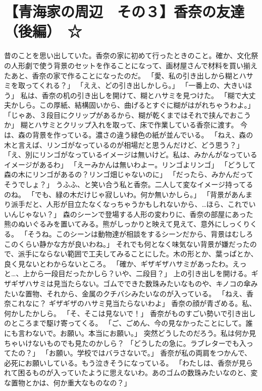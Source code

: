 \section{【青海家の周辺　その３】香奈の友達（後編）　☆}

昔のことを思い出していた。香奈の家に初めて行ったときのこと。確か、文化祭の人形劇で使う背景のセットを作ることになって、画材屋さんで材料を買い揃えたあと、香奈の家で作ることになったのだ。
「愛、私の引き出しから糊とハサミを取ってくれる？」
「ええ、どの引き出しかしら。」
「一番上の、大きいほう」
私は、香奈の机の引き出しを開けて、糊とハサミを見つけた。
「糊で大丈夫かしら。この厚紙、結構固いから、曲げるとすぐに糊がはがれちゃうわよ。」
「じゃあ、３段目にクリップがあるから、糊が乾くまではそれで挟んでおこうか」
糊とハサミとクリップ入れを取って、床で作業している香奈に渡す。
今は、森の背景を作っている。濃さの違う緑色の紙が並んでいる。
「ねえ、森の木と言えば、リンゴがなっているのが相場だと思うんだけど、どう思う？」
「え、別にリンゴがなっているイメージは無いけど。私は、みかんがなっているイメージがあるわ」
「えーみかんは無いわよー。リンゴよリンゴ」
「どうして森の木にリンゴがあるの？リンゴ畑じゃないのに」
「だったら、みかんだってそうでしょ？」
うふふ、と笑い合う私と香奈。二人して変なイメージ持ってるのね。
「でも、緑の木だけじゃ寂しいわ。何か無いかしら。」
「背景があんまり派手だと、人形が目立たなくなっちゃうかもしれないから、…ほら、これでいいんじゃない？」
森のシーンで登場する人形の変わりに、香奈の部屋にあった熊のぬいぐるみを置いてみる。熊がしっかりと映えて見えて、意外にしっくりくる。
「そうね。このシーンは動物達が相談をするシーンだから、背景はむしろこのくらい静かな方が良いわね。」
それでも何となく味気ない背景が嫌だったので、派手にならない範囲で工夫してみることにした。木の形とか、葉っぱとか、良く見ないとわからないところ。
「確か、ギザギザハサミがあったわ。えっと…、上から一段目だったかしら？いや、二段目？」
上の引き出しを開ける。ギザギザハサミは見当たらない。ゴムでできた数珠みたいなものや、キノコの傘みたいな置物、それから、金属のクチバシみたいなのが入っている。
「ねえ、香奈これなに？ ギザギザのハサミ見当たらないわよ」
香奈の顔が青ざめる。私、何かしたかしら。
「そ、そこは見ないで！」
香奈がものすごい勢いで引き出しのところまで駆け寄ってくる。
「ご、ごめん、今の見なかったことにして。誰にも言わないで。お願い。本当にお願い。」
突然どうしたのだろう。私は何か見ちゃいけないものでも見たのかしら？
「どうしたの急に。ラブレターでも入ってたの？」
「お願い。学校ではバラさないで。」
香奈が私の両肩をつかんで、必死にお願いしている。もう泣きそうになっている。
「わたしは、香奈が見られて困るものが入っていたように思えないわ。あのゴムの数珠みたいなのと、変な置物とかは、何か重大なものなの？」
